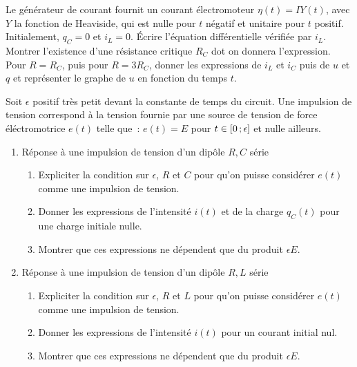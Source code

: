 \begin{exercice}%
  \label{exo:RLCparallelle}
  Le générateur de courant fournit un courant électromoteur \(\eta(t) = I 
  Y(t)\), avec \(Y\) la fonction de Heaviside, qui est nulle pour \(t\) négatif 
  et unitaire pour \(t\) positif. Initialement, \(q_C=0\) et \(i_L=0\). Écrire 
  l'équation différentielle vérifiée par \(i_L\). Montrer l'existence d'une 
  résistance critique \(R_C\) dot on donnera l'expression. Pour \(R=R_C\), puis 
  pour \(R=3R_C\), donner les expressions de \(i_L\) et \(i_C\) puis de \(u\) 
  et \(q\) et représenter le graphe de \(u\) en fonction du temps \(t\).
\end{exercice}%
\begin{exercice}%
  Soit \(\epsilon\) positif très petit devant la constante de temps du circuit. 
  Une impulsion de tension correspond à la tension fournie par une source de 
  tension de force éléctromotrice \(e(t)\) telle que~: \(e(t) = E\) pour \(t 
  \in \left[ 0 \, ;  \epsilon \right]\) et nulle ailleurs.
  \begin{enumerate}
    \item Réponse à une impulsion de tension d'un dipôle \(R,C\) série
      \begin{enumerate}
        \item Expliciter la condition sur \(\epsilon\), \(R\) et \(C\) pour 
          qu'on puisse considérer \(e(t)\) comme une impulsion de tension.
        \item Donner les expressions de l'intensité \(i(t)\) et de la charge 
          \(q_C(t)\) pour une charge initiale nulle.
        \item Montrer que ces expressions ne dépendent que du produit 
          \(\epsilon E\).
      \end{enumerate}
    \item Réponse à une impulsion de tension d'un dipôle \(R,L\) série
      \begin{enumerate}
        \item Expliciter la condition sur \(\epsilon\), \(R\) et \(L\) pour 
          qu'on puisse considérer \(e(t)\) comme une impulsion de tension.
        \item Donner les expressions de l'intensité \(i(t)\) pour un courant 
          initial nul.
        \item Montrer que ces expressions ne dépendent que du produit 
          \(\epsilon E\).
      \end{enumerate}

\end{enumerate}
\end{exercice}

